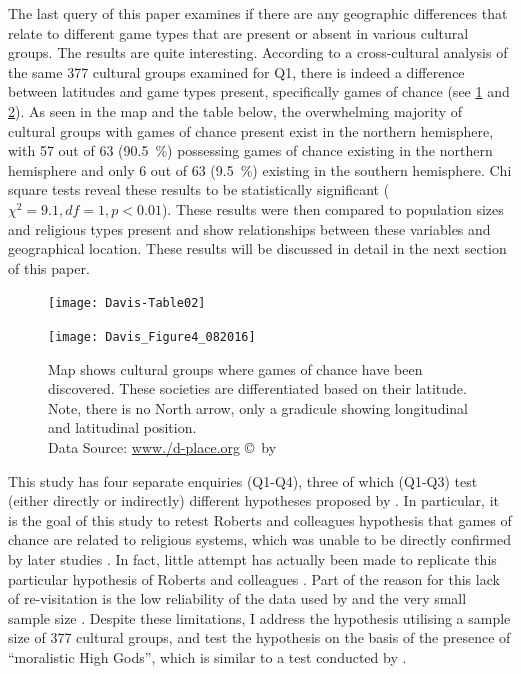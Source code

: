 \documentclass[%
	]{ijsra}
\begin{document}
The last query of this paper examines if there are any geographic differences that relate to different game types that are present or absent in various cultural groups. The results are quite interesting. According to a cross-cultural analysis of the same 377 cultural groups examined for Q1, there is indeed a difference between latitudes and game types present, specifically games of chance (see \cref{fig:Davis-Table03} and \cref{fig:Figure4_Davis_082016}). As seen in the map and the table below, the overwhelming majority of cultural groups with games of chance present exist in the northern hemisphere, with 57 out of 63 (\SI{90.5}{\percent}) possessing games of chance existing in the northern hemisphere and only 6 out of 63 (\SI{9.5}{\percent}) existing in the southern hemisphere. Chi square tests reveal these results to be statistically significant ($\chi^{2} = 9.1, df = 1, p < 0.01$). These results were then compared to population sizes and religious types present and show relationships between these variables and geographical location. These results will be discussed in detail in the next section of this paper.

\begin{figure}[!htb] %
	\texttt{[image: Davis-Table02]}
	\label{fig:Davis-Table03}
\end{figure}

\begin{figure}[!htb] %
	\texttt{[image: Davis\_Figure4\_082016]}
	\caption{Map shows cultural groups where games of chance have been discovered. These societies are differentiated based on their latitude. Note, there is no North arrow, only a gradicule showing longitudinal and latitudinal position.
	{\normalfont\scriptsize \\ Data Source: \href{http:/www./d-place.org}{www./d-place.org} \copyright\ by 
                 \shortauthor
                  }}
	\label{fig:Figure4_Davis_082016}
\end{figure}
This study has four separate enquiries (Q1-Q4), three of which (Q1-Q3) test (either directly or indirectly) different hypotheses proposed by \textcite{roberts1959}. In particular, it is the goal of this study to retest Roberts and colleagues hypothesis that games of chance are related to religious systems, which was unable to be directly confirmed by later studies \parencites[e.g.][]{ball1972}{chick1998}. In fact, little attempt has actually been made to replicate this particular hypothesis of Roberts and colleagues \parencite[18]{binde2005}. Part of the reason for this lack of re-visitation is the low reliability of the data used by \textcite{roberts1959} and the very small sample size \parencite[18]{binde2005}. Despite these limitations, I address the hypothesis utilising a sample size of 377 cultural groups, and test the hypothesis on the basis of the presence of ``moralistic High Gods”, which is similar to a test conducted by \textcite{ball1972}. 
\end{document}
